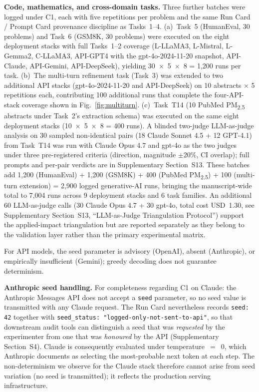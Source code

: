 \documentclass[sn-nature]{sn-jnl}
\begin{document}
\textbf{Code, mathematics, and cross-domain tasks.} Three further batches were logged under C1, each with five repetitions per problem and the same Run Card / Prompt Card provenance discipline as Tasks~1--4.
(a)~Task~5 (HumanEval, 30 problems) and Task~6 (GSM8K, 30 problems) were executed on the eight deployment stacks with full Tasks~1--2 coverage (L-LLaMA3, L-Mistral, L-Gemma2, C-LLaMA3, API-GPT4 with the gpt-4o-2024-11-20 snapshot, API-Claude, API-Gemini, API-DeepSeek), yielding 30~$\times$~5~$\times$~8 = 1{,}200 runs per task.
(b)~The multi-turn refinement task (Task~3) was extended to two additional API stacks (gpt-4o-2024-11-20 and API-DeepSeek) on 10 abstracts $\times$ 5 repetitions each, contributing 100 additional runs that complete the four-API-stack coverage shown in Fig.~\ref{fig:multiturn}.
(c)~Task~T14 (10 PubMed PM\textsubscript{2.5} abstracts under Task~2's extraction schema) was executed on the same eight deployment stacks (10~$\times$~5~$\times$~8 = 400 runs).
A blinded two-judge LLM-as-judge analysis on 30 sampled non-identical pairs (18 Claude Sonnet 4.5 + 12 GPT-4.1) from Task~T14 was run with Claude Opus 4.7 and gpt-4o as the two judges under three pre-registered criteria (direction, magnitude $\pm$20\%, CI overlap); full prompts and per-pair verdicts are in Supplementary Section~S13.
These batches add 1{,}200 (HumanEval) + 1{,}200 (GSM8K) + 400 (PubMed PM\textsubscript{2.5}) + 100 (multi-turn extension) = 2{,}900 logged generative-AI runs, bringing the manuscript-wide total to 7{,}004 runs across 9 deployment stacks and 6 task families. An additional 60 LLM-as-judge calls (30 Claude Opus 4.7 + 30 gpt-4o, total cost USD~1.30, see Supplementary Section~S13, ``LLM-as-Judge Triangulation Protocol'') support the applied-impact triangulation but are reported separately as they belong to the validation layer rather than the primary experimental matrix.

For API models, the seed parameter is advisory (OpenAI\cite{openai2024seed}), absent (Anthropic), or empirically insufficient (Gemini); greedy decoding does not guarantee determinism\cite{ouyang2024nondeterminism}.

\textbf{Anthropic seed handling.}
For completeness regarding C1 on Claude: the Anthropic Messages API does not accept a \texttt{seed} parameter, so no seed value is transmitted with any Claude request.
The Run Card nevertheless records \texttt{seed: 42} together with \texttt{seed\_status: "logged-only-not-sent-to-api"}, so that downstream audit tools can distinguish a seed that was \emph{requested} by the experimenter from one that was \emph{honoured} by the API (Supplementary Section~S4).
Claude is consequently evaluated under temperature~$=$~0, which Anthropic documents as selecting the most-probable next token at each step.
The non-determinism we observe for the Claude stack therefore cannot arise from seed variation (no seed is transmitted); it reflects the production serving infrastructure.
\end{document}
